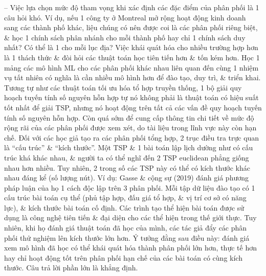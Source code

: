 \documentclass{article}
\begin{document}
\begin{itemize}
\begin{itemize}
        -- Việc lựa chọn mức độ tham vọng khi xác định các đặc điểm của phân phối là 1 câu hỏi khó. Ví dụ, nếu 1 công ty ở Montreal mở rộng hoạt động kinh doanh sang các thành phố khác, liệu chúng có nên được coi là các phân phối riêng biệt, \& học 1 chính sách phân nhánh cho mỗi thành phố hay chỉ 1 chính sách duy nhất? Có thể là 1 cho mỗi lục địa? Việc khái quát hóa cho nhiều trường hợp hơn là 1 thách thức \& đòi hỏi các thuật toán học tiên tiến hơn \& tốn kém hơn. Học 1 mảng các mô hình ML cho các phân phối khác nhau liên quan đến cùng 1 nhiệm vụ tất nhiên có nghĩa là cần nhiều mô hình hơn để đào tạo, duy trì, \& triển khai. Tương tự như các thuật toán tối ưu hóa tổ hợp truyền thống, 1 bộ giải quy hoạch tuyến tính số nguyên hỗn hợp tự nó không phải là thuật toán có hiệu suất tốt nhất để giải TSP, nhưng nó hoạt động trên tất cả các vấn đề quy hoạch tuyến tính số nguyên hỗn hợp. Còn quá sớm để cung cấp thông tin chi tiết về mức độ rộng rãi của các phân phối được xem xét, do tài liệu trong lĩnh vực này còn hạn chế. Đối với các học giả tạo ra các phân phối tổng hợp, 2 trục điều tra trực quan là ``cấu trúc'' \& ``kích thước''. Một TSP \& 1 bài toán lập lịch dường như có cấu trúc khá khác nhau, \& người ta có thể nghĩ đến 2 TSP euclidean phẳng giống nhau hơn nhiều. Tuy nhiên, 2 trong số các TSP này có thể có kích thước khác nhau đáng kể (số lượng nút). Ví dụ: Gasse \& cộng sự (2019) đánh giá phương pháp luận của họ 1 cách độc lập trên 3 phân phối. Mỗi tập dữ liệu đào tạo có 1 cấu trúc bài toán cụ thể (phủ tập hợp, đấu giá tổ hợp, \& vị trí cơ sở có năng lực), \& kích thước bài toán cố định. Các trình tạo thể hiện bài toán được sử dụng là công nghệ tiên tiến \& đại diện cho các thể hiện trong thế giới thực. Tuy nhiên, khi họ đánh giá thuật toán đã học của mình, các tác giả đẩy các phân phối thử nghiệm lên kích thước lớn hơn. Ý tưởng đằng sau điều này: đánh giá xem mô hình đã học có thể khái quát hóa thành phân phối lớn hơn, thực tế hơn hay chỉ hoạt động tốt trên phân phối hạn chế của các bài toán có cùng kích thước. Câu trả lời phần lớn là khẳng định.

\end{itemize}
\end{itemize}
\end{document}
